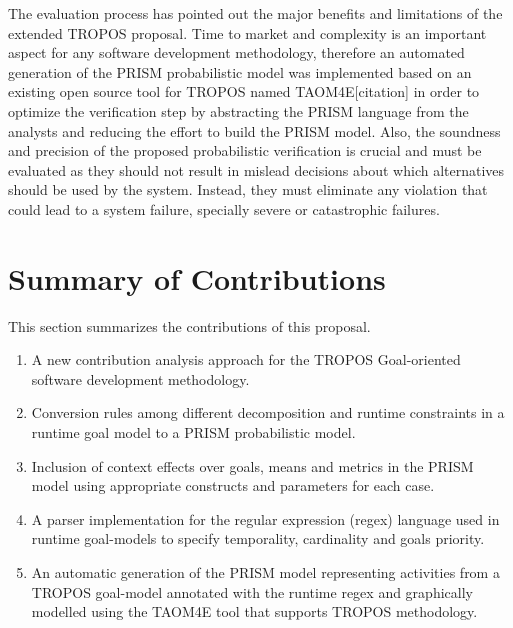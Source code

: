 The evaluation process has pointed out the major benefits and limitations of the extended TROPOS proposal. Time to market and complexity is an important aspect for any software development methodology, therefore an automated generation of the PRISM probabilistic model was implemented based on an existing open source tool for TROPOS named TAOM4E[citation] in order to optimize the verification step by abstracting the PRISM language from the analysts and reducing the effort to build the PRISM model.  Also, the soundness and precision of the proposed probabilistic verification is crucial and must be evaluated as they should not result in mislead decisions about which alternatives should be used by the system. Instead, they must eliminate any violation that could lead to a system failure, specially severe or catastrophic failures.


\section{Summary of Contributions}

This section summarizes the contributions of this proposal.


\begin{enumerate}

\item A new contribution analysis approach for the TROPOS Goal-oriented software development methodology.

\item Conversion rules among different decomposition and runtime constraints in a runtime goal model to a PRISM probabilistic model.

\item Inclusion of context effects over goals, means and metrics in the PRISM model using appropriate constructs and parameters for each case.

\item A parser implementation for the regular expression (regex) language used in runtime goal-models to specify temporality, cardinality and goals priority. 

\item An automatic generation of the PRISM model representing activities from a TROPOS goal-model annotated with the runtime regex and graphically modelled using the TAOM4E tool that supports TROPOS methodology.

\end{enumerate}

